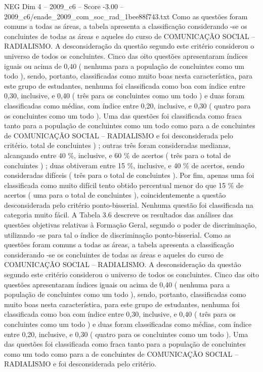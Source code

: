 \begin{textsample}{NEG Dim 4 – 2009\_c6 – Score -3.00 – 2009\_c6/enade\_2009\_com\_soc\_rad\_1bee88f743.txt}
Como as questões foram comuns a todas as áreas, a tabela apresenta a classificação considerando -se os concluintes de todas as áreas e aqueles do curso de COMUNICAÇÃO SOCIAL – RADIALISMO.
A desconsideração da questão segundo este critério considerou o universo de todos os concluintes.
Cinco das oito questões apresentaram índices iguais ou acima de 0,40 ( nenhuma para a população de concluintes como um todo ), sendo, portanto, classificadas como muito boas nesta característica, para este grupo de estudantes, nenhuma foi classificada como boa com índice entre 0,30, inclusive, e 0,40 ( três para os concluintes como um todo ) e duas foram classificadas como médias, com índice entre 0,20, inclusive, e 0,30 ( quatro para os concluintes como um todo ).
Uma das questões foi classificada como fraca tanto para a população de concluintes como um todo como para a de concluintes de COMUNICAÇÃO SOCIAL – RADIALISMO e foi desconsiderada pelo critério. total de concluintes ) ; outras três foram consideradas medianas, alcançando entre 40 \%, inclusive, e 60 \% de acertos ( três para o total de concluintes ) ; duas obtiveram entre 15 \%, inclusive, e 40 \% de acertos, sendo consideradas difíceis ( três para o total de concluintes ).
Por fim, apenas uma foi classificada como muito difícil tento obtido percentual menor do que 15 \% de acertos ( uma para o total de concluintes ), coincidentemente a questão desconsiderada pelo critério ponto-bisserial.
Nenhuma questão foi classificada na categoria muito fácil.
A Tabela 3.6 descreve os resultados das análises das questões objetivas relativas à Formação Geral, segundo o poder de discriminação, utilizando -se para tal o índice de discriminação ponto-bisserial.
Como as questões foram comuns a todas as áreas, a tabela apresenta a classificação considerando -se os concluintes de todas as áreas e aqueles do curso de COMUNICAÇÃO SOCIAL – RADIALISMO.
A desconsideração da questão segundo este critério considerou o universo de todos os concluintes.
Cinco das oito questões apresentaram índices iguais ou acima de 0,40 ( nenhuma para a população de concluintes como um todo ), sendo, portanto, classificadas como muito boas nesta característica, para este grupo de estudantes, nenhuma foi classificada como boa com índice entre 0,30, inclusive, e 0,40 ( três para os concluintes como um todo ) e duas foram classificadas como médias, com índice entre 0,20, inclusive, e 0,30 ( quatro para os concluintes como um todo ).
Uma das questões foi classificada como fraca tanto para a população de concluintes como um todo como para a de concluintes de COMUNICAÇÃO SOCIAL – RADIALISMO e foi desconsiderada pelo critério.

\end{textsample}
